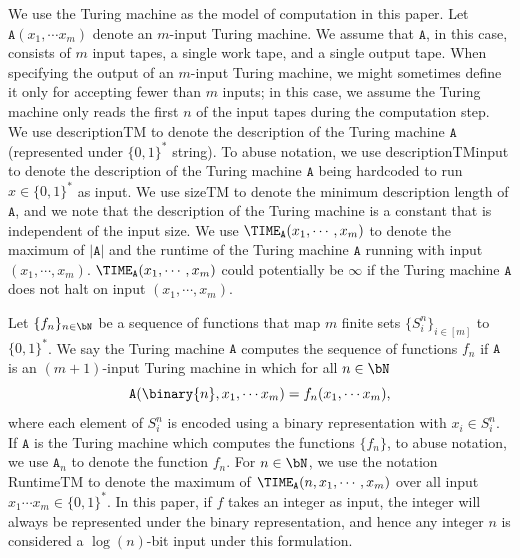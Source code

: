 We use the Turing machine as the model of computation in this paper. Let $\mathtt{A}(x_1, \cdots x_m)$ denote an $m$-input Turing machine. We assume that $\mathtt{A}$, in this case,  consists of $m$ input tapes, a single work tape, and a single output tape. When specifying the output of an $m$-input Turing machine, we might sometimes define it only for accepting fewer than $m$ inputs; in this case, we assume the Turing machine only reads the first $n$ of the input tapes during the computation step. We use \gls{descriptionTM} to denote the description of the Turing machine $\mathtt{A}$ (represented under $\{0,1\}^*$ string). To abuse notation, we use \gls{descriptionTMinput} to denote the description of the Turing machine $\mathtt{A}$ being hardcoded to run $x \in \{0,1\}^*$ as input. We use \gls{sizeTM} to denote the minimum description length of $\mathtt{A}$, and we note that the description of the Turing machine is a constant that is independent of the input size. We use $\TIME_{\mathtt{A}}(x_1, \cdots , x_m)$ to denote the maximum of $|\mathtt{A}|$ and the runtime of the Turing machine $\mathtt{A}$ running with input $(x_1, \cdots , x_m)$. $\TIME_{\mathtt{A}}(x_1, \cdots , x_m)$ could potentially be $\infty$ if the Turing machine $\mathtt{A}$ does not halt on input $(x_1, \cdots , x_m)$.

Let $\{f_n\}_{n \in \bN}$ be a sequence of functions that map $m$ finite sets $\{S_i^n\}_{i \in [m]}$ to $\{0,1\}^*$. We say the Turing machine $\mathtt{A}$ computes the sequence of functions $f_n$ if $\mathtt{A}$ is an $(m+1)$-input Turing machine in which for all $n \in \bN$ 
\begin{equation*}
	\mathtt{A}(\binary{n}, x_1, \cdots x_m) = f_n( x_1, \cdots x_m), 
\end{equation*}
where each element of $S_i^n$ is encoded using a binary representation with $x_i \in S_i^n$. If $\mathtt{A}$ is the Turing machine which computes the functions $\{f_n\}$, to abuse notation, we use $\mathtt{A}_n$ to denote the function $f_n$. For $n \in \bN$, we use the notation \gls{RuntimeTM} to denote the maximum of $\TIME_{\mathtt{A}}(n, x_1, \cdots, x_m)$ over all input $x_1 \cdots x_m \in \{0,1\}^*$. In this paper, if $f$ takes an integer as input, the integer will always be represented under the binary representation, and hence any integer $n$ is considered a $\log(n)$-bit input under this formulation. 

